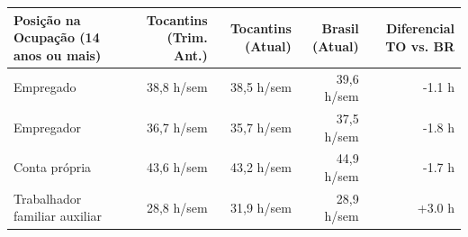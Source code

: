 \documentclass[10pt,a4paper]{article}
\begin{document}
\par\vspace{0.08cm}
\noindent\begin{minipage}{\linewidth}
  \par\vspace{2pt}
  {\fontsize{7.0}{8.6}\selectfont\setlength{\tabcolsep}{4.5pt}%
\begin{tabularx}{\linewidth}{>{\raggedright\arraybackslash}Xrrrr}
\toprule
\rowcolor{corprimaria} \textbf{\color{white}Posição na Ocupação (14 anos ou mais)} & \textbf{\color{white}Tocantins (Trim. Ant.)} & \textbf{\color{white}Tocantins (Atual)} & \textbf{\color{white}Brasil (Atual)} & \textbf{\color{white}Diferencial TO vs. BR} \\
\midrule
Empregado & 38,8 h/sem & 38,5 h/sem & 39,6 h/sem & -1.1 h \\
\rowcolor{corfundo} Empregador & 36,7 h/sem & 35,7 h/sem & 37,5 h/sem & -1.8 h \\
Conta própria & 43,6 h/sem & 43,2 h/sem & 44,9 h/sem & -1.7 h \\
\rowcolor{corfundo} Trabalhador familiar auxiliar & 28,8 h/sem & 31,9 h/sem & 28,9 h/sem & +3.0 h \\
\bottomrule
\end{tabularx}%
}
  \par{}
\end{minipage}
\par\vspace{0.08cm}
\end{document}
